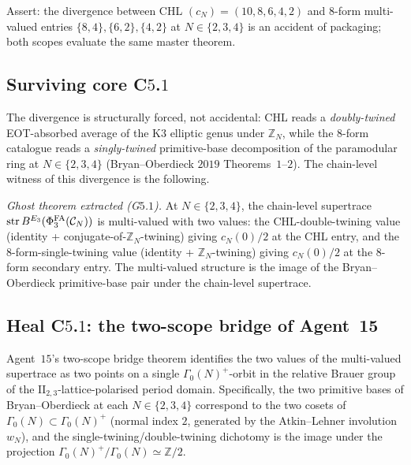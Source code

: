 Assert: the divergence between CHL $(c_N) = (10, 8, 6, 4, 2)$ and
8-form multi-valued entries $\{8, 4\}, \{6, 2\}, \{4, 2\}$ at
$N \in \{2, 3, 4\}$ is an accident of packaging; both scopes evaluate
the same master theorem.

\subsection*{Surviving core C$5$.$1$}

The divergence is structurally forced, not accidental: CHL reads a
\emph{doubly-twined} EOT-absorbed average of the K$3$ elliptic genus
under $\mathbb{Z}_N$, while the 8-form catalogue reads a
\emph{singly-twined} primitive-base decomposition of the paramodular
ring at $N \in \{2, 3, 4\}$ (Bryan--Oberdieck $2019$ Theorems~$1$--$2$).
The chain-level witness of this divergence is the following.

\emph{Ghost theorem extracted (G$5$.$1$).} At $N \in \{2, 3, 4\}$, the
chain-level supertrace $\mathrm{str}\,B^{E_{3}}(\Phi^{\mathrm{FA}}_{3}(\mathcal{C}_N))$ is
multi-valued with two values: the CHL-double-twining value
(identity + conjugate-of-$\mathbb{Z}_N$-twining) giving $c_N(0)/2$ at
the CHL entry, and the 8-form-single-twining value (identity +
$\mathbb{Z}_N$-twining) giving $c_N(0)/2$ at the 8-form secondary
entry. The multi-valued structure is the image of the
Bryan--Oberdieck primitive-base pair under the chain-level supertrace.

\subsection*{Heal C$5$.$1$: the two-scope bridge of Agent~15}

Agent~$15$'s two-scope bridge theorem identifies the two values of the
multi-valued supertrace as two points on a single $\Gamma_0(N)^+$-orbit
in the relative Brauer group of the $\mathrm{II}_{2, 3}$-lattice-polarised
period domain. Specifically, the two primitive bases of
Bryan--Oberdieck at each $N \in \{2, 3, 4\}$ correspond to the two
cosets of $\Gamma_0(N) \subset \Gamma_0(N)^+$ (normal index $2$,
generated by the Atkin--Lehner involution $w_N$), and the
single-twining/double-twining dichotomy is the image under the
projection
$\Gamma_0(N)^+ / \Gamma_0(N) \simeq \mathbb{Z}/2$.

